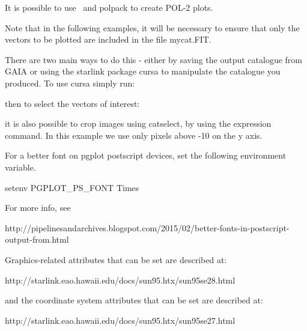 It is possible to use \Kappa\ and polpack to create POL-2 plots.

\begin{terminalv}
\end{terminalv}

Note that in the following examples, it will be necessary to ensure that only the
vectors to be plotted are included in the file mycat.FIT.

There are two main ways to do this - either by saving the output catalogue
from GAIA or using the starlink package cursa to manipulate the catalogue you produced.
To use cursa simply run:

\begin{terminalv}
\end{terminalv}

then to select the vectors of interest:

\begin{terminalv}
\end{terminalv}

it is also possible to crop images using catselect, by using the expression command. 
In this example we use only pixels above -10 on the y axis.

\begin{terminalv}
\end{terminalv}




\begin{tip}
For a better font on pgplot postscript devices, set the
following environment variable. 

\begin{terminalv}
setenv PGPLOT_PS_FONT Times
\end{terminalv}

For more info, see

http://pipelinesandarchives.blogspot.com/2015/02/better-fonts-in-postscript-output-from.html

Graphics-related attributes that can be set are described at:

http://starlink.eao.hawaii.edu/docs/sun95.htx/sun95se28.html

and the coordinate system attributes that can be set are
described at:

http://starlink.eao.hawaii.edu/docs/sun95.htx/sun95se27.html
\end{tip}






